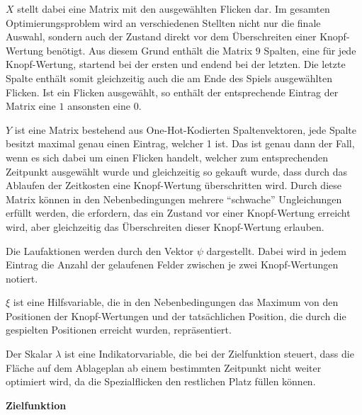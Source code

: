\vspace*{-1cm}

$X$ stellt dabei eine Matrix mit den ausgewählten Flicken dar. Im gesamten Optimierungsproblem wird an verschiedenen Stellten nicht nur die finale Auswahl, sondern auch der Zustand direkt vor dem Überschreiten einer Knopf-Wertung benötigt. Aus diesem Grund enthält die Matrix $9$ Spalten, eine für jede Knopf-Wertung, startend bei der ersten und endend bei der letzten. Die letzte Spalte enthält somit gleichzeitig auch die am Ende des Spiels ausgewählten Flicken. Ist ein Flicken ausgewählt, so enthält der entsprechende Eintrag der Matrix eine $1$ ansonsten eine $0$.

$Y$ ist eine Matrix bestehend aus One-Hot-Kodierten Spaltenvektoren, \dash jede Spalte besitzt maximal genau einen Eintrag, welcher 1 ist. Das ist genau dann der Fall, wenn es sich dabei um einen Flicken handelt, welcher zum entsprechenden Zeitpunkt ausgewählt wurde und gleichzeitig so gekauft wurde, dass durch das Ablaufen der Zeitkosten eine Knopf-Wertung überschritten wird. Durch diese Matrix können in den Nebenbedingungen mehrere \enquote{schwache} Ungleichungen erfüllt werden, die erfordern, das ein Zustand vor einer Knopf-Wertung erreicht wird, aber gleichzeitig das Überschreiten dieser Knopf-Wertung erlauben.

Die Laufaktionen werden durch den Vektor $\psi$ dargestellt. Dabei wird in jedem Eintrag die Anzahl der gelaufenen Felder zwischen je zwei Knopf-Wertungen notiert.

$\xi$ ist eine Hilfsvariable, die in den Nebenbedingungen das Maximum von den Positionen der Knopf-Wertungen und der tatsächlichen Position, die durch die gespielten Positionen erreicht wurden, repräsentiert.

Der Skalar $\lambda$ ist eine Indikatorvariable, die bei der Zielfunktion steuert, dass die Fläche auf dem Ablageplan ab einem bestimmten Zeitpunkt nicht weiter optimiert wird, da die Spezialflicken den restlichen Platz füllen können.

\textbf{Zielfunktion}

